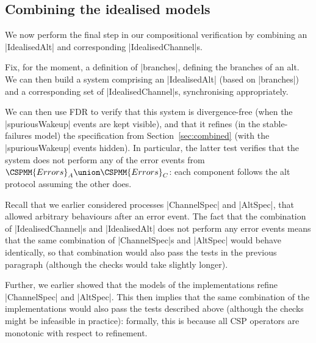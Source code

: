 \subsection{Combining the idealised models}

We now perform the final step in our compositional verification by combining
an |IdealisedAlt| and corresponding |IdealisedChannel|s.

Fix, for the moment, a definition of |branches|, defining the branches of an
alt.  We can then build a system comprising an |IdealisedAlt| (based on
|branches|) and a corresponding set of |IdealisedChannel|s, synchronising
appropriately.

We can then use FDR to verify that this system is divergence-free (when the
|spuriousWakeup| events are kept visible), and that it refines (in the
stable-failures model) the specification from Section~\ref{sec:combined} (with
the |spuriousWakeup| events hidden).  In particular, the latter test verifies
that the system does not perform any of the error events
from~$\CSPMM{Errors}_A \union \CSPMM{Errors}_C$: each component follows the
alt protocol assuming the other does. 

Recall that we earlier considered processes |ChannelSpec| and |AltSpec|, that
allowed arbitrary behaviours after an error event.  The fact that the
combination of |IdealisedChannel|s and |IdealisedAlt| does not perform any
error events means that the same combination of |ChannelSpec|s and |AltSpec|
would behave identically, so that combination would also pass the tests in the
previous paragraph (although the checks would take slightly longer).  

Further, we earlier showed that the models of the implementations refine
|ChannelSpec| and |AltSpec|.  This then implies that the same combination of
the implementations would also pass the tests described above (although the
checks might be infeasible in practice): formally, this is because all CSP
operators are monotonic with respect to refinement.

